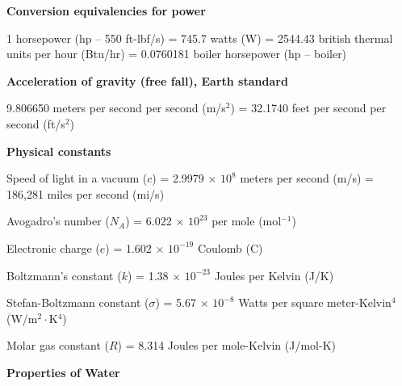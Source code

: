 
\goodbreak 
{\bf Conversion equivalencies for power}

\vskip 5pt {\narrower \noindent \baselineskip5pt
1 horsepower (hp -- 550 ft-lbf/s) = 745.7 watts (W) = 2544.43 british thermal units per hour (Btu/hr) = 0.0760181 boiler horsepower (hp -- boiler)
\par} \vskip 10pt
\bigskip 
 

\goodbreak 
{\bf Acceleration of gravity (free fall), Earth standard}

\vskip 5pt {\narrower \noindent \baselineskip5pt
9.806650 meters per second per second (m/s$^{2}$) = 32.1740 feet per second per second (ft/s$^{2}$)
\par} \vskip 10pt
\bigskip 
 

\goodbreak 
{\bf Physical constants}

\vskip 5pt {\narrower \noindent \baselineskip5pt
Speed of light in a vacuum ($c$) = 2.9979 $\times$ $10^8$ meters per second (m/s) = 186,281 miles per second (mi/s)
\par} \vskip 5pt
\vskip 5pt {\narrower \noindent \baselineskip5pt
Avogadro's number ($N_A$) = 6.022 $\times$ $10^{23}$ per mole (mol$^{-1}$)
\par} \vskip 5pt
\vskip 5pt {\narrower \noindent \baselineskip5pt
Electronic charge ($e$) = 1.602 $\times$ $10^{-19}$ Coulomb (C)
\par} \vskip 5pt
\vskip 5pt {\narrower \noindent \baselineskip5pt
Boltzmann's constant ($k$) = 1.38 $\times$ $10^{-23}$ Joules per Kelvin (J/K)
\par} \vskip 5pt
\vskip 5pt {\narrower \noindent \baselineskip5pt
Stefan-Boltzmann constant ($\sigma$) = 5.67 $\times$ $10^{-8}$ Watts per square meter-Kelvin$^{4}$ (W/m$^{2} \cdot$K$^{4}$)
\par} \vskip 5pt
\vskip 5pt {\narrower \noindent \baselineskip5pt
Molar gas constant ($R$) = 8.314 Joules per mole-Kelvin (J/mol-K)
\par} \vskip 10pt
\bigskip 
 

\goodbreak 
{\bf Properties of Water}


